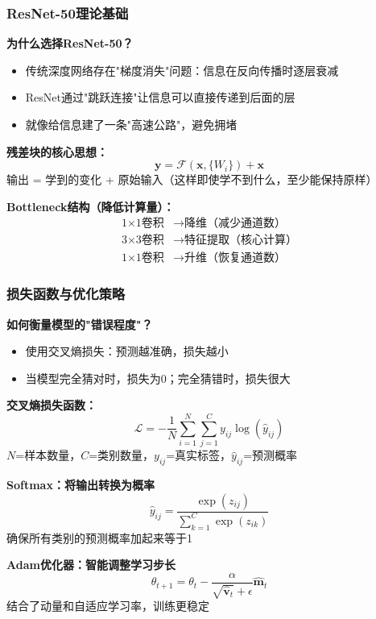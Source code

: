 \documentclass[12pt]{beamer}
\begin{document}
\begin{frame}
\frametitle{ResNet-50理论基础}
\textbf{为什么选择ResNet-50？}
\begin{itemize}
    \item 传统深度网络存在"梯度消失"问题：信息在反向传播时逐层衰减
    \item ResNet通过"跳跃连接"让信息可以直接传递到后面的层
    \item 就像给信息建了一条"高速公路"，避免拥堵
\end{itemize}

\vspace{0.2cm}
\textbf{残差块的核心思想：}
\[
\mathbf{y} = \mathcal{F}(\mathbf{x}, \{W_i\}) + \mathbf{x}
\]
\small{输出 = 学到的变化 + 原始输入（这样即使学不到什么，至少能保持原样）}

\vspace{0.2cm}
\textbf{Bottleneck结构（降低计算量）：}
\[
\begin{aligned}
\text{1×1卷积} &\rightarrow \text{降维（减少通道数）} \\
\text{3×3卷积} &\rightarrow \text{特征提取（核心计算）} \\
\text{1×1卷积} &\rightarrow \text{升维（恢复通道数）}
\end{aligned}
\]
\end{frame}

\begin{frame}
\frametitle{损失函数与优化策略}
\textbf{如何衡量模型的"错误程度"？}
\begin{itemize}
    \item 使用交叉熵损失：预测越准确，损失越小
    \item 当模型完全猜对时，损失为0；完全猜错时，损失很大
\end{itemize}

\textbf{交叉熵损失函数：}
\[
\mathcal{L} = -\frac{1}{N}\sum_{i=1}^{N}\sum_{j=1}^{C} y_{ij} \log(\hat{y}_{ij})
\]
\small{\(N\)=样本数量，\(C\)=类别数量，\(y_{ij}\)=真实标签，\(\hat{y}_{ij}\)=预测概率}

\textbf{Softmax：将输出转换为概率}
\[
\hat{y}_{ij} = \frac{\exp(z_{ij})}{\sum_{k=1}^{C} \exp(z_{ik})}
\]
\small{确保所有类别的预测概率加起来等于1}

\textbf{Adam优化器：智能调整学习步长}
\[
\theta_{t+1} = \theta_t - \frac{\alpha}{\sqrt{\hat{\mathbf{v}}_t} + \epsilon} \hat{\mathbf{m}}_t
\]
\small{结合了动量和自适应学习率，训练更稳定}
\end{frame}
\end{document}
